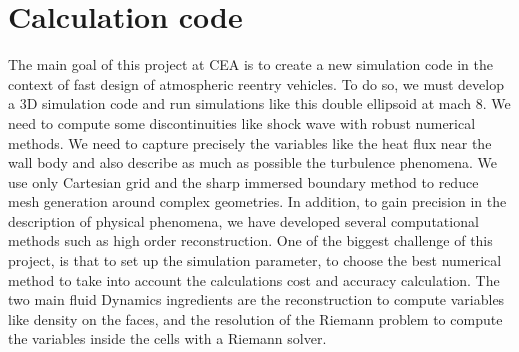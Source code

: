 \section{Calculation code}


The main goal  of this project at CEA is to create a new simulation code in the context of fast design of atmospheric reentry vehicles. To do so, we must develop a 3D simulation code and run simulations like this double ellipsoid at mach 8. We need to compute some discontinuities like shock wave with robust numerical methods. We need to capture precisely the variables like the heat flux near the wall body and also describe as much as possible the turbulence phenomena. We use only Cartesian grid and the sharp immersed boundary method to reduce mesh generation around complex geometries.  In addition, to gain precision in the description of physical phenomena, we have developed several computational  methods such as high order reconstruction. One of the biggest challenge of this project, is that  to set up the simulation parameter, to choose the best numerical method to take into account the calculations cost and accuracy calculation. The two main fluid Dynamics ingredients are the reconstruction  to compute variables like density on the faces, and the resolution of the Riemann problem to compute the variables inside the cells with a Riemann solver.
